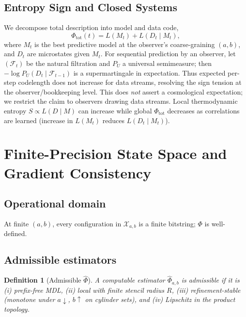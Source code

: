 \documentclass[aps,preprint,onecolumn,longbibliography,nofootinbib]{revtex4-2}
\numberwithin{equation}{section}        %
\newtheorem{definition}{Definition}
\begin{document}
\subsection{Entropy Sign and Closed Systems}\label{sec:closed}
We decompose total description into model and data code,
\begin{equation}
\Phi_{\text{tot}}(t) = L(M_t) + L(D_t \mid M_t),\label{eq:mdl-split}
\end{equation}
where $M_t$ is the best predictive model at the observer's coarse-graining $(a,b)$, and $D_t$ are microstates given $M_t$. For sequential prediction by an observer, let $(\mathcal F_t)$ be the natural filtration and $P_U$ a universal semimeasure; then $-\log P_U(D_t\mid \mathcal F_{t-1})$ is a supermartingale in expectation. Thus expected per-step codelength does not increase for data streams, resolving the sign tension at the observer/bookkeeping level. This does \emph{not} assert a cosmological expectation; we restrict the claim to observers drawing data streams. Local thermodynamic entropy $S\propto L(D\mid M)$ can increase while global $\Phi_{\text{tot}}$ decreases as correlations are learned (increase in $L(M_t)$ reduces $L(D_t\mid M_t)$).

\section{Finite-Precision State Space and Gradient Consistency}
\subsection{Operational domain}
At finite $(a,b)$, every configuration in $\mathcal X_{a,b}$ is a finite bitstring; $\Phi$ is well-defined.

\subsection{Admissible estimators}
\begin{definition}[Admissible $\widehat\Phi$]
A computable estimator $\widehat\Phi_{a,b}$ is \emph{admissible} if it is (i) prefix-free MDL, (ii) local with finite stencil radius $R$, (iii) refinement-stable (monotone under $a\downarrow$, $b\uparrow$ on cylinder sets), and (iv) Lipschitz in the product topology.
\end{definition}
\end{document}
